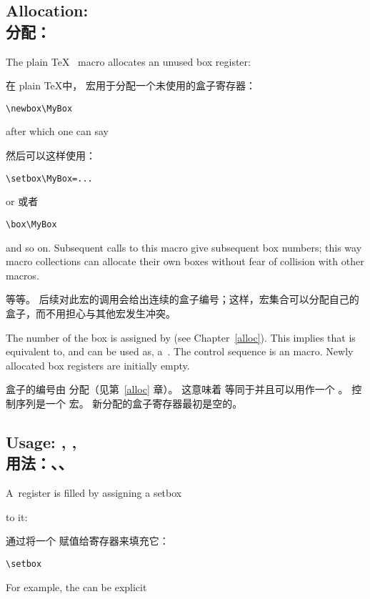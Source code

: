 \subsection{Allocation: \\分配：}

The plain \TeX\  macro allocates an unused
box register:

在 plain \TeX 中， 宏用于分配一个未使用的盒子寄存器：
\begin{verbatim}
\newbox\MyBox 
\end{verbatim}
after which one can say

然后可以这样使用：
\begin{verbatim}
\setbox\MyBox=...
\end{verbatim}
or 或者\begin{verbatim}
\box\MyBox
\end{verbatim}
and so on.
Subsequent calls to this macro give subsequent box numbers;
this way macro collections can allocate their own boxes
without fear of collision with other macros.

等等。
后续对此宏的调用会给出连续的盒子编号；这样，宏集合可以分配自己的盒子，而不用担心与其他宏发生冲突。

The number of the box is assigned by 
(see Chapter~\ref{alloc}). 
This implies that  is equivalent to,
and can be used as, a~.
The control sequence
\altt
{} is an  macro.
Newly allocated box registers are initially empty.

盒子的编号由  分配（见第~\ref{alloc} 章）。
这意味着  等同于并且可以用作一个 。
 控制序列是一个  宏。
新分配的盒子寄存器最初是空的。


\subsection{Usage: , , \\用法：、、}

A~register is filled by assigning a 
\cstoidx setbox\par
to it:

通过将一个  赋值给寄存器来填充它：
\begin{Disp}\verb>\setbox>\end{Disp}
For example, the  can be explicit

